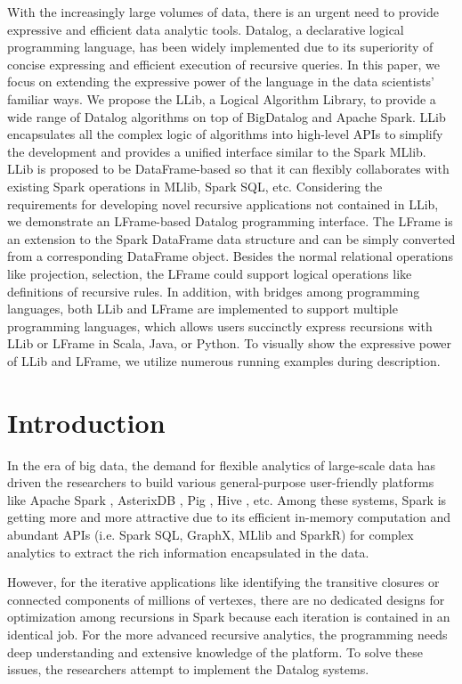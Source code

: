 
With the increasingly large volumes of data, there is an urgent need to provide expressive and efficient data analytic tools. Datalog, a declarative logical programming language, has been widely implemented  due to its superiority of concise expressing and efficient execution of recursive queries. In this paper, we focus on extending the expressive power of the language in the data scientists' familiar ways. We propose the LLib,  a Logical Algorithm Library, to provide a wide range of Datalog algorithms on top of BigDatalog and Apache Spark.  LLib encapsulates all the complex logic of algorithms into high-level APIs to simplify the development and   provides a unified interface similar to the Spark MLlib. LLib is proposed to be  DataFrame-based so that it can flexibly collaborates with existing Spark operations in MLlib, Spark SQL, etc.
Considering the requirements for developing novel recursive applications not contained in LLib, we demonstrate an LFrame-based Datalog programming interface. The LFrame is an extension to the Spark DataFrame data structure and can be simply converted from a corresponding DataFrame object. Besides the normal relational operations like projection, selection, the LFrame could support  logical operations like definitions of recursive rules. 
In addition, with bridges among programming languages, both LLib and LFrame are implemented to support multiple programming languages, which allows users succinctly express recursions with LLib or LFrame in Scala, Java, or Python. 
To visually show the expressive power of LLib and LFrame, we utilize numerous running examples during description.  

\section{Introduction}
In the era of big data, the demand for flexible analytics of large-scale data has driven the researchers to build various general-purpose user-friendly platforms like Apache Spark   \citep{zaharia2012resilient}, AsterixDB \citep{alsubaiee2014asterixdb}, Pig \citep{olston2008pig}, Hive \citep{thusoo2009hive}, etc.  Among these systems, Spark is getting more and more attractive due to its efficient in-memory computation and abundant APIs (i.e. Spark SQL, GraphX, MLlib and SparkR) for complex analytics  to extract the rich information encapsulated in the data.

However, for the iterative applications like identifying the transitive closures or connected components of millions of vertexes, there are no dedicated designs for optimization among recursions in Spark because each iteration is contained in an identical job.  For the more advanced recursive analytics, the programming needs deep understanding and extensive knowledge of the platform.  To solve these issues, the researchers attempt to implement the Datalog  \citep{consens1990low} systems. 

